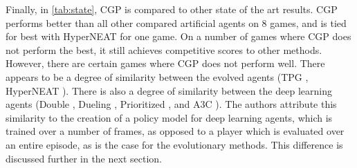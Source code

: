 \documentclass[sigconf,screen]{acmart}\settopmatter{printfolios=true,printacmref=false}
\begin{document}
Finally, in \autoref{tab:state}, CGP is compared to other state of the art
results. CGP performs better than all other compared artificial agents on 8
games, and is tied for best with HyperNEAT for one game. On a number of games
where CGP does not perform the best, it still achieves competitive scores to
other methods. However, there are certain games where CGP does not perform well.
There appears to be a degree of similarity between the evolved agents (TPG
\cite{kelly2017emergent}, HyperNEAT \cite{hausknecht2014neuroevolution}). There
is also a degree of similarity between the deep learning agents (Double
\cite{van2016deep}, Dueling \cite{wang2015dueling}, Prioritized
\cite{schaul2015prioritized}, and A3C \cite{mnih2016asynchronous}). The authors
attribute this similarity to the creation of a policy model for deep learning
agents, which is trained over a number of frames, as opposed to a player which
is evaluated over an entire episode, as is the case for the evolutionary
methods. This difference is discussed further in the next section.
\end{document}
